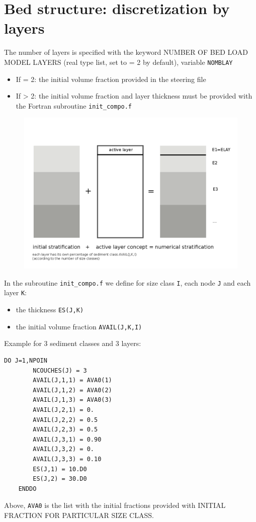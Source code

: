 \section{Bed structure: discretization by layers}
The number of layers is specified with the keyword {\ttfamily NUMBER OF BED LOAD MODEL LAYERS} (real type list, set to {\ttfamily = 2} by default), variable \texttt{NOMBLAY}
\begin{itemize}
\item If {\ttfamily = 2}: the initial volume fraction provided in the steering file
\item If {\ttfamily > 2}: the initial volume fraction and layer thickness must be provided with the Fortran subroutine \texttt{init\_compo.f}
\end{itemize}

\begin{figure}[H]%
\begin{center}
\includegraphics[scale=0.4]{./graphics/layers_1.png}
\end{center}
\end{figure}

In the subroutine \texttt{init\_compo.f} we define for size class \texttt{I}, each node \texttt{J} and each layer \texttt{K}:
\begin{itemize}
\item the thickness \texttt{ES(J,K)}
\item the initial volume fraction \texttt{AVAIL(J,K,I)}
\end{itemize}

\pagebreak

Example for 3 sediment classes and 3 layers:
\begin{lstlisting}[frame=trBL]   
    DO J=1,NPOIN
        NCOUCHES(J) = 3
        AVAIL(J,1,1) = AVA0(1) 
        AVAIL(J,1,2) = AVA0(2) 
        AVAIL(J,1,3) = AVA0(3) 
        AVAIL(J,2,1) = 0.
        AVAIL(J,2,2) = 0.5
        AVAIL(J,2,3) = 0.5
        AVAIL(J,3,1) = 0.90
        AVAIL(J,3,2) = 0.
        AVAIL(J,3,3) = 0.10 
        ES(J,1) = 10.D0
        ES(J,2) = 30.D0
    ENDDO
\end{lstlisting}
Above, \texttt{AVA0} is the list with the initial fractions provided with {\ttfamily INITIAL FRACTION FOR PARTICULAR SIZE CLASS}.

